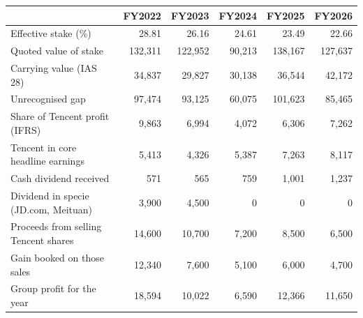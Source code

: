 \begin{tabular}{lrrrrr}
\toprule
 & FY2022 & FY2023 & FY2024 & FY2025 & FY2026 \\
\midrule
Effective stake (\%) & 28.81 & 26.16 & 24.61 & 23.49 & 22.66 \\
Quoted value of stake & 132,311 & 122,952 & 90,213 & 138,167 & 127,637 \\
Carrying value (IAS 28) & 34,837 & 29,827 & 30,138 & 36,544 & 42,172 \\
Unrecognised gap & 97,474 & 93,125 & 60,075 & 101,623 & 85,465 \\
Share of Tencent profit (IFRS) & 9,863 & 6,994 & 4,072 & 6,306 & 7,262 \\
Tencent in core headline earnings & 5,413 & 4,326 & 5,387 & 7,263 & 8,117 \\
Cash dividend received & 571 & 565 & 759 & 1,001 & 1,237 \\
Dividend in specie (JD.com, Meituan) & 3,900 & 4,500 & 0 & 0 & 0 \\
Proceeds from selling Tencent shares & 14,600 & 10,700 & 7,200 & 8,500 & 6,500 \\
Gain booked on those sales & 12,340 & 7,600 & 5,100 & 6,000 & 4,700 \\
Group profit for the year & 18,594 & 10,022 & 6,590 & 12,366 & 11,650 \\
\bottomrule
\end{tabular}
